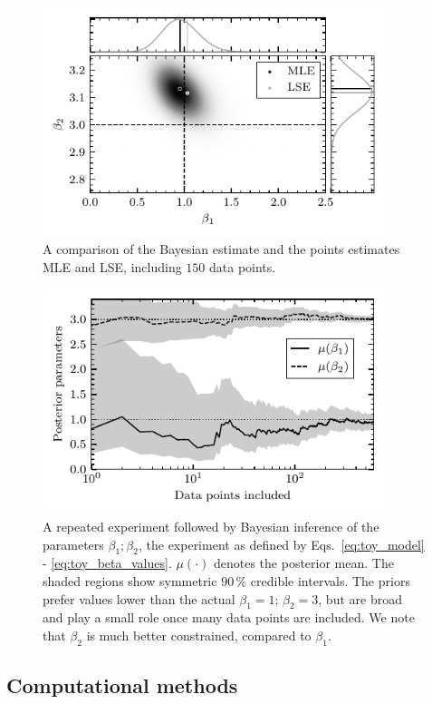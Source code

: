 \begin{figure}[h]
 	\centering
 	\includegraphics[width=10cm]{figures/bayesian_multivariate.pdf}
 	\caption{A comparison of the Bayesian estimate and the points estimates MLE and LSE, including $150$ data points.}
 	\label{fig:bayesian_multivariate}
\end{figure}

\begin{figure}[h]
 	\centering
 	\includegraphics[width=10cm]{figures/bayesian.pdf}
 	\caption{A repeated experiment followed by Bayesian inference of the parameters $\beta_1; \beta_2$, the experiment as defined by Eqs.~\ref{eq:toy_model} - \ref{eq:toy_beta_values}. $\mu(\cdot)$ denotes the posterior mean. The shaded regions show symmetric $90 \, \%$ credible intervals. The priors prefer values lower than the actual $\beta_1=1;\,\beta_2=3$, but are broad and play a small role once many data points are included. We note that $\beta_2$ is much better constrained, compared to $\beta_1$.}
 	\label{fig:bayesian_demosntration}
\end{figure}

\subsection{Computational methods}

